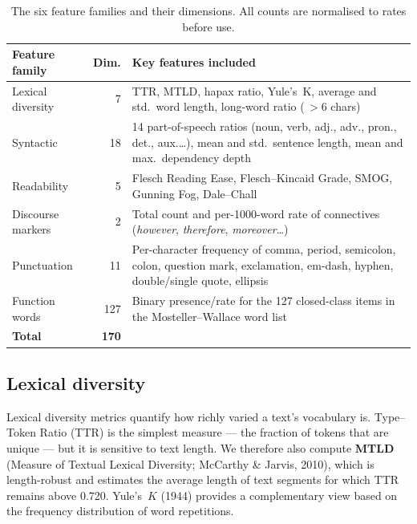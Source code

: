 \documentclass[11pt,a4paper]{article}
\begin{document}
\begin{table}[ht]
\centering
\small
\setlength{\tabcolsep}{7pt}
\caption{The six feature families and their dimensions.
         All counts are normalised to rates before use.}
\label{tab:features}
\begin{tabular}{l r p{6.8cm}}
\toprule
\textbf{Feature family} & \textbf{Dim.} & \textbf{Key features included}\\
\midrule
Lexical diversity  &  7 & TTR, MTLD, hapax ratio, Yule's~K,
                          average and std.\ word length,
                          long-word ratio (\,$>$6 chars)\\[3pt]
Syntactic          & 18 & 14 part-of-speech ratios (noun,
                          verb, adj., adv., pron., det., aux.\ldots),
                          mean and std.\ sentence length,
                          mean and max.\ dependency depth\\[3pt]
Readability        &  5 & Flesch Reading Ease, Flesch--Kincaid
                          Grade, SMOG, Gunning Fog,
                          Dale--Chall\\[3pt]
Discourse markers  &  2 & Total count and per-1000-word rate
                          of connectives (\textit{however},
                          \textit{therefore}, \textit{moreover}\ldots)\\[3pt]
Punctuation        & 11 & Per-character frequency of comma,
                          period, semicolon, colon, question
                          mark, exclamation, em-dash, hyphen,
                          double/single quote, ellipsis\\[3pt]
Function words     &127 & Binary presence/rate for the
                          127 closed-class items in the
                          Mosteller--Wallace word list\\
\midrule
\textbf{Total}     &\textbf{170} & \\
\bottomrule
\end{tabular}
\end{table}

\subsection{Lexical diversity}

Lexical diversity metrics quantify how richly varied a text's
vocabulary is. Type--Token Ratio (TTR) is the simplest measure ---
the fraction of tokens that are unique --- but it is sensitive to
text length. We therefore also compute \textbf{MTLD} (Measure of
Textual Lexical Diversity; McCarthy \& Jarvis, 2010), which is
length-robust and estimates the average length of text segments for
which TTR remains above 0.720.  Yule's~$K$ (1944) provides a
complementary view based on the frequency distribution of word
repetitions.
\end{document}
